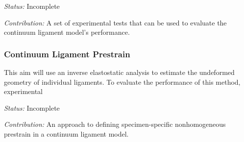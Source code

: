 \emph{Status:} Incomplete

\emph{Contribution:} A set of experimental tests that can be used to evaluate the continuum ligament model's performance.
\subsubsection{Continuum Ligament Prestrain}
This aim will use an inverse elastostatic analysis to estimate the undeformed geometry of individual ligaments. To evaluate the performance of this method, experimental

\emph{Status:} Incomplete

\emph{Contribution:} An approach to defining specimen-specific nonhomogeneous prestrain in a continuum ligament model.



